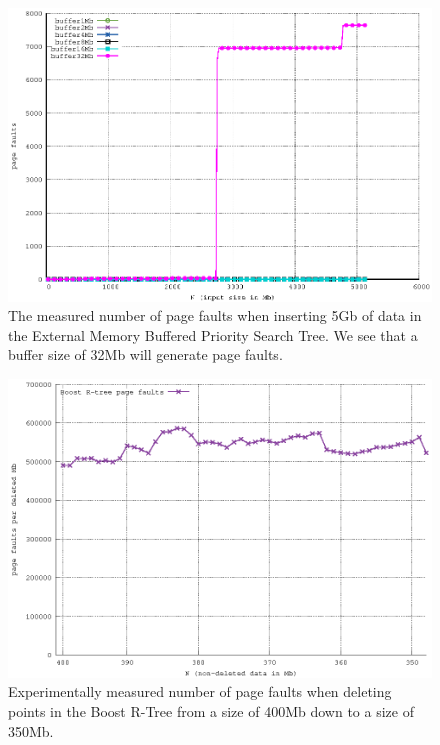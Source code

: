 \documentclass[twoside,11pt,openright]{report}
\begin{document}
\begin{figure}[h]
\centering
\includegraphics[width=1\textwidth]{../src/experiments/gerth_buffer_size_experiment_results/2016-05-03.13_51_54/pfs}
\caption{The measured number of page faults when inserting 5Gb of data in the External Memory Buffered Priority Search Tree. We see that a buffer size of 32Mb will generate page faults.}
\label{fig:page_faults_for_large_buffer_size}
\end{figure}

\begin{figure}[h]
\centering
\includegraphics[width=1\textwidth]{../src/experiments/delete_experiment_results/2016-05-31.08_55_51/pfs}
\caption{Experimentally measured number of page faults when deleting points in the Boost R-Tree from a size of 400Mb down to a size of 350Mb.}
\label{fig:page_faults_boost_r_tree}
\end{figure}
\end{document}
